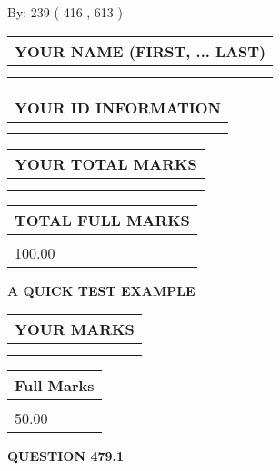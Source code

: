 \documentclass[12pt]{article}
\begin{document}
   
\hspace{1.0in} By: 
 239 ( 416 ,  613 )
   
   
   
   
\newpage 
\setcounter{page}{ 
   479001 } 
   
   
   
   
\noindent\begin{tabular}{|l|}
\hline
YOUR NAME (FIRST, ... LAST)  \\
\hline
 \\ 
 \\ 
\hline
\end{tabular}
\hspace{0.05in} \begin{tabular}{|l|}
\hline
 YOUR   ID   INFORMATION  \\
\hline
 \\ 
 \\ 
\hline
\end{tabular}
   
   
\vspace{0.2in}\noindent\begin{tabular}{|l|}
\hline
YOUR TOTAL MARKS  \\
\hline
 \\ 
 \\ 
\hline
\end{tabular}
\hspace{0.05in} \begin{tabular}{|l|}
\hline
TOTAL FULL MARKS  \\
\hline
 \\ 
100.00 \\
\hline
\end{tabular}
   
   
 \vspace{0.2in}
{\LARGE {\textbf{ A QUICK TEST EXAMPLE}}}
   
   
  
\vspace{0.2in}
  
\noindent\begin{tabular}{|l|}
\hline
 YOUR MARKS  \\
\hline
 \\ 
 \\ 
\hline
\end{tabular}
\hspace{0.05in} \begin{tabular}{|l|}
\hline
 Full Marks  \\
\hline
 \\ 
50.00 \\
\hline
\end{tabular}
{\textbf{\Large{QUESTION
479.1 
}}}
  
\end{document}
